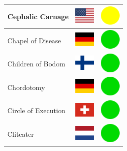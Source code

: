 \documentclass[12pt, a4paper, twoside]{report}
\begin{document}
\begin{center}
\begin{longtable}{|p{5cm}|p{2cm}|p{2cm}|}
 Cephalic Carnage                                           & \includegraphics[width=1cm]{../4x3/us} &   \includegraphics[width=1cm]{../likes/m} \\ \hline
 Chapel of Disease                                          & \includegraphics[width=1cm]{../4x3/de} &   \includegraphics[width=1cm]{../likes/y} \\ \hline
 Children of Bodom                                          & \includegraphics[width=1cm]{../4x3/fi} &   \includegraphics[width=1cm]{../likes/y} \\ \hline
 Chordotomy                                                 & \includegraphics[width=1cm]{../4x3/de} &   \includegraphics[width=1cm]{../likes/y} \\ \hline
 Circle of Execution                                        & \includegraphics[width=1cm]{../4x3/ch} &   \includegraphics[width=1cm]{../likes/y} \\ \hline
 Cliteater                                                  & \includegraphics[width=1cm]{../4x3/nl} &   \includegraphics[width=1cm]{../likes/y} \\ \hline

\end{longtable}
\end{center}
\end{document}
